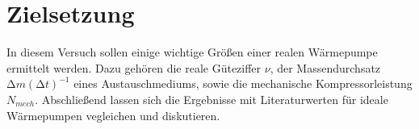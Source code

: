 \section{Zielsetzung}
\label{sec:Zielsetzung}
In diesem Versuch sollen einige wichtige Größen einer realen Wärmepumpe ermittelt werden.
Dazu gehören die reale Güteziffer $\nu$, der Massendurchsatz $\increment m (\increment t)^{-1}$ eines Austauschmediums,
sowie die mechanische Kompressorleistung $N_{mech}$. Abschließend lassen sich die Ergebnisse
mit Literaturwerten für ideale Wärmepumpen vegleichen und diskutieren.
